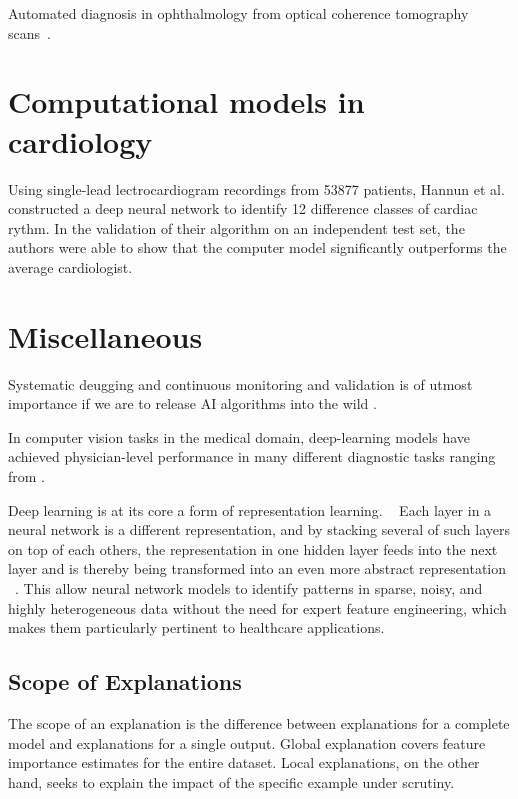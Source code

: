 Automated diagnosis in ophthalmology 
from optical coherence tomography scans~\autocite{defauwClinically2018}.

\section{Computational models in cardiology}

Using single-lead lectrocardiogram recordings from \num{53877} patients,
Hannun et al.\autocite{hannunCardiologistlevel2019}
constructed a deep neural network
to identify 12 difference classes of cardiac rythm.
In the validation of their algorithm on an independent test set,
the authors were able to show that the computer model
significantly outperforms the average cardiologist. 



\section{Miscellaneous}

Systematic deugging and continuous monitoring and validation 
is of utmost importance if we are to release AI algorithms into the wild%
\autocite{topolHighperformance2019}.

In computer vision tasks in the medical domain,
deep-learning models have achieved physician-level performance
in many different diagnostic tasks
ranging from .


Deep learning is at its core a form of representation learning.
~\autocite{estevaGuide2019}
Each layer in a neural network is a different representation,
and by stacking several of such layers on top of each others,
the representation in one hidden layer
feeds into the next layer and
is thereby being transformed into an even more abstract representation%
~\autocite{estevaGuide2019}.
This allow neural network models to identify patterns in sparse, noisy,
and highly heterogeneous data without the need for expert feature engineering,
which makes them particularly pertinent to healthcare applications.%
~



\subsection{Scope of Explanations}

The scope of an explanation is the difference between
explanations for a complete model and
explanations for a single output.
Global explanation covers feature importance estimates 
for the entire dataset.
Local explanations, on the other hand, seeks to explain
the impact of the specific example under scrutiny.

